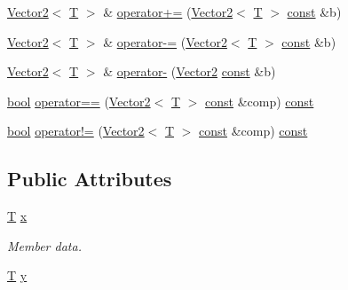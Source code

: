 \begin{DoxyCompactItemize}
\item 
\hyperlink{structarcade_1_1_vector2}{Vector2}$<$ \hyperlink{curses_8priv_8h_a5ef253115820acf7d27f3c5c3b02a0f0}{T} $>$ \& \hyperlink{structarcade_1_1_vector2_aacc845f46aa08f89ad2b95bb477b6f47}{operator+=} (\hyperlink{structarcade_1_1_vector2}{Vector2}$<$ \hyperlink{curses_8priv_8h_a5ef253115820acf7d27f3c5c3b02a0f0}{T} $>$ \hyperlink{term__entry_8h_a57bd63ce7f9a353488880e3de6692d5a}{const} \&b)
\item 
\hyperlink{structarcade_1_1_vector2}{Vector2}$<$ \hyperlink{curses_8priv_8h_a5ef253115820acf7d27f3c5c3b02a0f0}{T} $>$ \& \hyperlink{structarcade_1_1_vector2_a5c585ae80c2dffa086b6294044940970}{operator-\/=} (\hyperlink{structarcade_1_1_vector2}{Vector2}$<$ \hyperlink{curses_8priv_8h_a5ef253115820acf7d27f3c5c3b02a0f0}{T} $>$ \hyperlink{term__entry_8h_a57bd63ce7f9a353488880e3de6692d5a}{const} \&b)
\item 
\hyperlink{structarcade_1_1_vector2}{Vector2}$<$ \hyperlink{curses_8priv_8h_a5ef253115820acf7d27f3c5c3b02a0f0}{T} $>$ \& \hyperlink{structarcade_1_1_vector2_a025cdb8a7b0ea7341d2dbefc7830bdef}{operator-\/} (\hyperlink{structarcade_1_1_vector2}{Vector2} \hyperlink{term__entry_8h_a57bd63ce7f9a353488880e3de6692d5a}{const} \&b)
\item 
\hyperlink{term__entry_8h_a002004ba5d663f149f6c38064926abac}{bool} \hyperlink{structarcade_1_1_vector2_af83d57db233f180be2b667a91ce9f2c9}{operator==} (\hyperlink{structarcade_1_1_vector2}{Vector2}$<$ \hyperlink{curses_8priv_8h_a5ef253115820acf7d27f3c5c3b02a0f0}{T} $>$ \hyperlink{term__entry_8h_a57bd63ce7f9a353488880e3de6692d5a}{const} \&comp) \hyperlink{term__entry_8h_a57bd63ce7f9a353488880e3de6692d5a}{const} 
\item 
\hyperlink{term__entry_8h_a002004ba5d663f149f6c38064926abac}{bool} \hyperlink{structarcade_1_1_vector2_a74fb77153d87ef8a8640b74746cf5cdb}{operator!=} (\hyperlink{structarcade_1_1_vector2}{Vector2}$<$ \hyperlink{curses_8priv_8h_a5ef253115820acf7d27f3c5c3b02a0f0}{T} $>$ \hyperlink{term__entry_8h_a57bd63ce7f9a353488880e3de6692d5a}{const} \&comp) \hyperlink{term__entry_8h_a57bd63ce7f9a353488880e3de6692d5a}{const} 
\end{DoxyCompactItemize}
\subsection*{Public Attributes}
\begin{DoxyCompactItemize}
\item 
\hyperlink{curses_8priv_8h_a5ef253115820acf7d27f3c5c3b02a0f0}{T} \hyperlink{structarcade_1_1_vector2_a3aa24aa40f68932ef8ad701fa1bc13c1}{x}
\begin{DoxyCompactList}\small\item\em Member data. \end{DoxyCompactList}\item 
\hyperlink{curses_8priv_8h_a5ef253115820acf7d27f3c5c3b02a0f0}{T} \hyperlink{structarcade_1_1_vector2_a860cfc12ed261e292b150171d5bb5b96}{y}
\end{DoxyCompactItemize}


